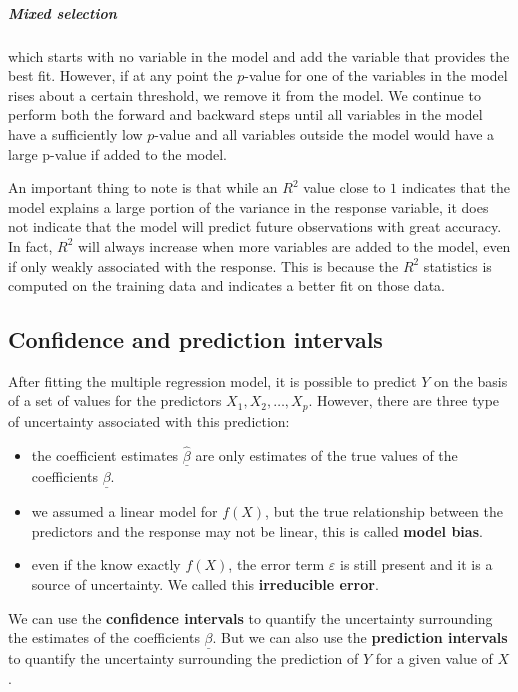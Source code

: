 \subparagraph*{Mixed selection} which starts with no variable in the model and add the variable that provides the best fit. However, if at any point the $p$-value for one of the variables in the model rises about a certain threshold, we remove it from the model. We continue to perform both the forward and backward steps until all variables in the model have a sufficiently low $p$-value and all variables outside the model would have a large p-value if added to the model.

An important thing to note is that while an $R^2$ value close to $1$ indicates that the model explains a large portion of the variance in the response variable, it does not indicate that the model will predict future observations with great accuracy. In fact, $R^2$ will always increase when more variables are added to the model, even if only weakly associated with the response. This is because the $R^2$ statistics is computed on the training data and indicates a better fit on those data.


\subsection*{Confidence and prediction intervals}
After fitting the multiple regression model, it is possible to predict $Y$ on the basis of a set of values for the predictors $X_1, X_2, \dots, X_p$. However, there are three type of uncertainty associated with this prediction:
\begin{itemize}
    \item the coefficient estimates $\hat{\underline\beta}$ are only estimates of the true values of the coefficients $\underline\beta$.
    \item we assumed a linear model for $f(X)$, but the true relationship between the predictors and the response may not be linear, this is called \textbf{model bias}.
    \item even if the know exactly $f(X)$, the error term $\varepsilon$ is still present and it is a source of uncertainty. We called this \textbf{irreducible error}.
\end{itemize}

We can use the \textbf{confidence intervals} to quantify the uncertainty surrounding the estimates of the coefficients $\underline\beta$. 
But we can also use the \textbf{prediction intervals} to quantify the uncertainty surrounding the prediction of $Y$ for a given value of $X$.

